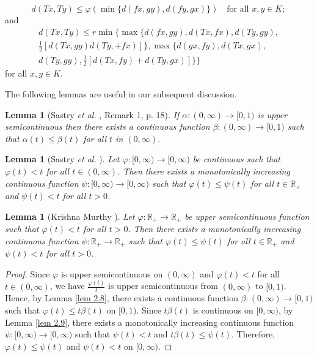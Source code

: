 \documentclass[a4paper,12pt,oneside]{article}
\newtheorem{lemma}[theorem]{Lemma}
\numberwithin{equation}{section}
\begin{document}
\begin{equation} \label{(2.7.4)}
  d(Tx,Ty) \leq \varphi(\min\{d(fx,gy),d(fy,gx)\}) \quad \text{for all } x,y \in K;
\end{equation}
and
\begin{multline} \label{(2.7.5)}
  d(Tx,Ty) \leq r \min\Big\{\max\big\{d(fx,gy),d(Tx,fx),d(Ty,gy),\\
\tfrac{1}{2}[d(Tx,gy)d(Ty,+fx)]\big\}, \max\big\{d(gx,fy),d(Tx,gx),\\
d(Ty,gy),\tfrac{1}{2}[d(Tx,fy)+d(Ty,gx)]\big\}\Big\}
\end{multline}
for all $x,y \in K$.

The following lemmas are useful in our subsequent discussion.

\begin{lemma}[Sastry \emph{et al.} \cite{Sastry2003}, Remark 1, p. 18] \label{lem 2.8}
If $\alpha:(0,\infty)\to[0,1)$ is upper semicontinuous then there exists a continuous function $\beta:(0,\infty)\to[0,1)$ such that $\alpha(t)\leq\beta(t)$ for all $t$ in $(0,\infty)$.
\end{lemma}

\begin{lemma}[Sastry \emph{et al.} \cite{Sastry2003}] \label{lem 2.9}
Let $\varphi:[0,\infty)\to[0,\infty)$ be continuous such that $\varphi(t)<t$ for all $t\in(0,\infty)$. Then there exists a monotonically increasing continuous function $\psi:[0,\infty)\to[0,\infty)$ such that $\varphi(t)\leq\psi(t)$ for all $t\in \mathbb{R}_{+}$ and $\psi(t)<t$ for all $t>0$.
\end{lemma}

\begin{lemma}[Krishna Murthy \cite{KrishnaMurthy2006}] \label{lem 2.10}
Let $\varphi:\mathbb{R}_{+}\to \mathbb{R}_{+}$ be upper semicontinuous function such that $\varphi(t)<t$ for all $t>0$. Then there exists a monotonically increasing continuous function $\psi:\mathbb{R}_{+}\to \mathbb{R}_{+}$ such that $\varphi(t)\leq\psi(t)$ for all $t\in \mathbb{R}_{+}$ and $\psi(t)<t$ for all $t>0$.
\end{lemma}

\begin{proof}
Since $\varphi$ is upper semicontinuous on $(0,\infty)$ and $\varphi(t)<t$ for all $t\in(0,\infty)$, we have $\frac{\varphi(t)}{t}$ is upper semicontinuous from $(0,\infty)$ to $[0,1)$. Hence, by Lemma \eqref{lem 2.8}, there exists a continuous function $\beta:(0,\infty)\to[0,1)$ such that $\varphi(t)\leq t\beta(t)$ on $[0,1)$. Since $t\beta(t)$ is continuous on $[0,\infty)$, by Lemma \eqref{lem 2.9}, there exists a monotonically increasing continuous function $\psi:[0,\infty)\to[0,\infty)$ such that $\psi(t)<t$ and $t\beta(t)\leq\psi(t)$. Therefore, $\varphi(t)\leq\psi(t)$ and $\psi(t)<t$ on $[0,\infty)$.
\end{proof}
\end{document}
